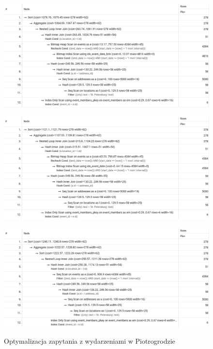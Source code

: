 \documentclass{article}
\begin{document}
\begin{figure}[htbp]
    \centering
    \begin{minipage}{0.3\textwidth}
        \centering
        \includegraphics[width=\linewidth]{images/show_events_in_st_petersburg with composite index (end_date, start_date) using brin.png}
        \label{fig:show_events_in_st_petersburg1}
    \end{minipage}
    \hfill
    \begin{minipage}{0.3\textwidth}
        \centering
        \includegraphics[width=\linewidth]{images/show_events_in_st_petersburg with composite index (end_date, start_date).png}
        \label{fig:show_events_in_st_petersburg3}
    \end{minipage}
    \hfill
    \begin{minipage}{0.3\textwidth}
        \centering
        \includegraphics[width=\linewidth]{images/show_events_in_st_petersburg without composite index.png}
        \label{fig:show_events_in_st_petersburg2}
    \end{minipage}
    \caption{Optymalizacja zapytania z wydarzeniami w Piotrogrodzie}
\end{figure}
\end{document}
